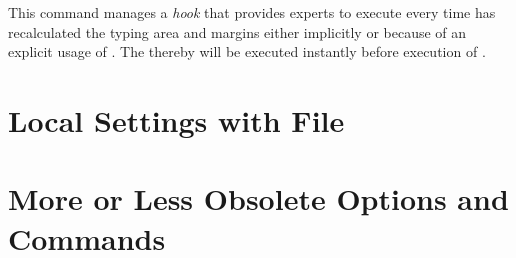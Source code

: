 \begin{Declaration}
\end{Declaration}%
%
This command manages a \emph{hook} that provides experts to execute
 every time  has recalculated the typing
area and margins either implicitly or because of an explicit usage of
. The  thereby will be executed instantly
before execution of .%
% 


\section{Local Settings with File }
\label{sec:typearea-experts.cfg}



\section{More or Less Obsolete Options and Commands}
\label{sec:typearea-experts.obsolete}


\endinput

